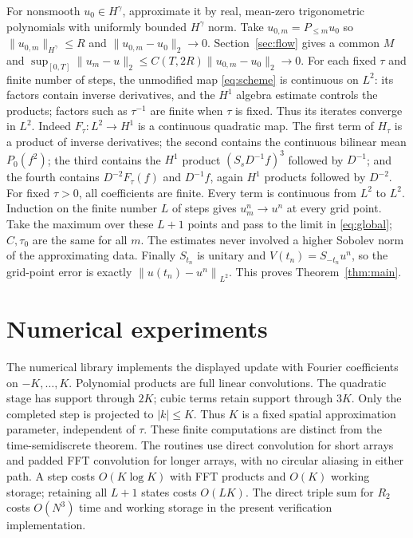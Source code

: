 \documentclass[11pt]{article}
\theoremstyle{remark}\newtheorem{remark}[theorem]{Remark}
\newcommand{\norm}[2][]{\left\lVert #2\right\rVert_{#1}}
\begin{document}
For nonsmooth $u_0\in H^\gamma$, approximate it by real, mean-zero trigonometric
polynomials with uniformly bounded $H^\gamma$ norm. Take $u_{0,m}=P_{\leq m}u_0$ so $\|u_{0,m}\|_{H^\gamma}\leq R$ and
$\|u_{0,m}-u_0\|_2\to0$. Section~\ref{sec:flow} gives a common $M$ and
$\sup_{[0,T]}\|u_m-u\|_2\leq C(T,2R)\|u_{0,m}-u_0\|_2\to0$.
For each fixed $\tau$ and finite number of steps, the unmodified map
\eqref{eq:scheme} is continuous on $L^2$: its factors contain inverse derivatives,
and the $H^1$ algebra estimate controls the products; factors such as
$\tau^{-1}$ are finite when $\tau$ is fixed. Thus its iterates converge in $L^2$.
Indeed $F_\tau:L^2\to H^1$ is a continuous quadratic map. The first
term of $H_\tau$ is a product of inverse derivatives; the second contains
the continuous bilinear mean $P_0(f^2)$; the third contains the $H^1$
product $(S_sD^{-1}f)^3$ followed by $D^{-1}$; and the fourth contains
$D^{-2}F_\tau(f)$ and $D^{-1}f$, again $H^1$ products followed by $D^{-2}$.
For fixed $\tau>0$, all coefficients are finite. Every term is continuous
from $L^2$ to $L^2$. Induction on the finite number $L$ of steps gives
$u_m^n\to u^n$ at every grid point. Take the maximum over these $L+1$
points and pass to the limit in \eqref{eq:global}; $C,\tau_0$ are the same
for all $m$.
The estimates never involved a higher Sobolev norm of the approximating data.
Finally $S_{t_n}$ is unitary and $V(t_n)=S_{-t_n}u^n$, so the grid-point error is
exactly $\norm[L^2]{u(t_n)-u^n}$. This proves Theorem~\ref{thm:main}.


\section{Numerical experiments}\label{sec:numerics}
The numerical library implements the displayed update with Fourier
coefficients on $-K,\ldots,K$. Polynomial products are full linear
convolutions. The quadratic stage has support through $2K$; cubic terms
retain support through $3K$. Only the completed step is projected to
$|k|\leq K$. Thus $K$ is a fixed spatial approximation parameter, independent
of $\tau$. These finite computations are distinct from the
time-semidiscrete theorem. The routines use direct convolution for short
arrays and padded FFT convolution for longer arrays, with no circular
aliasing in either path. A step costs $O(K\log K)$ with FFT products
and $O(K)$ working storage; retaining all $L+1$ states costs $O(LK)$.
The direct triple sum for $R_2$ costs $O(N^3)$ time and working storage
in the present verification implementation.
\end{document}
